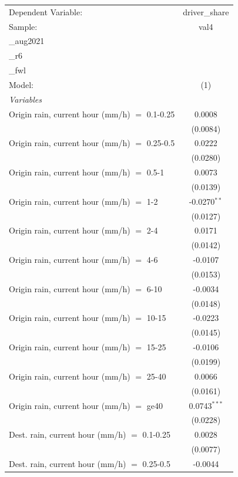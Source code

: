 \ifdefined\ifclassloaded
{}
\fi
\begingroup
\centering
\begin{tabular}{lc}
   \tabularnewline \midrule \midrule
   Dependent Variable: & driver\_share\\
   Sample: & val4\\_aug2021\\_r6\\_fwl \\
   Model: & (1)\\
   \midrule
   \emph{Variables}\\
   Origin rain, current hour (mm/h) $=$ 0.1-0.25 & 0.0008\\
    & (0.0084)\\
   Origin rain, current hour (mm/h) $=$ 0.25-0.5 & 0.0222\\
    & (0.0280)\\
   Origin rain, current hour (mm/h) $=$ 0.5-1 & 0.0073\\
    & (0.0139)\\
   Origin rain, current hour (mm/h) $=$ 1-2 & -0.0270$^{**}$\\
    & (0.0127)\\
   Origin rain, current hour (mm/h) $=$ 2-4 & 0.0171\\
    & (0.0142)\\
   Origin rain, current hour (mm/h) $=$ 4-6 & -0.0107\\
    & (0.0153)\\
   Origin rain, current hour (mm/h) $=$ 6-10 & -0.0034\\
    & (0.0148)\\
   Origin rain, current hour (mm/h) $=$ 10-15 & -0.0223\\
    & (0.0145)\\
   Origin rain, current hour (mm/h) $=$ 15-25 & -0.0106\\
    & (0.0199)\\
   Origin rain, current hour (mm/h) $=$ 25-40 & 0.0066\\
    & (0.0161)\\
   Origin rain, current hour (mm/h) $=$ ge40 & 0.0743$^{***}$\\
    & (0.0228)\\
   Dest. rain, current hour (mm/h) $=$ 0.1-0.25 & 0.0028\\
    & (0.0077)\\
   Dest. rain, current hour (mm/h) $=$ 0.25-0.5 & -0.0044\\

\end{tabular}
